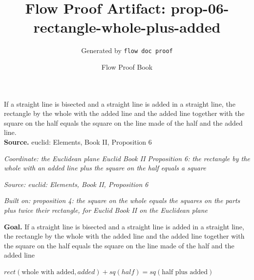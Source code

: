 \documentclass[11pt]{article}
\title{Flow Proof Artifact: prop-06-rectangle-whole-plus-added}
\author{Generated by \texttt{flow doc proof}}
\date{Flow Proof Book}
\theoremstyle{definition}
\begin{document}
\maketitle
If a straight line is bisected and a straight line is added in a straight line, the rectangle by the whole with the added line and the added line together with the square on the half equals the square on the line made of the half and the added line.\\[0.5em]
\textbf{Source.} euclid: Elements, Book II, Proposition 6\\[0.5em]
\bigskip
{}\par
\smallskip\noindent\textit{Coordinate: the Euclidean plane \cdot Euclid Book II \cdot Proposition 6: the rectangle by the whole with an added line plus the square on the half equals a square}\par
\smallskip\noindent\textit{Source: euclid: Elements, Book II, Proposition 6}\par
\smallskip\noindent\textit{Built on: proposition 4: the square on the whole equals the squares on the parts plus twice their rectangle, for Euclid Book II on the Euclidean plane}\par
\medskip
\noindent\textbf{Goal.} If a straight line is bisected and a straight line is added in a straight line, the rectangle by the whole with the added line and the added line together with the square on the half equals the square on the line made of the half and the added line\par
\noindent$\displaystyle rect(\text{whole with added}, added) + sq(half) = sq(\text{half plus added})$\par
\medskip
\noindent
\end{document}
